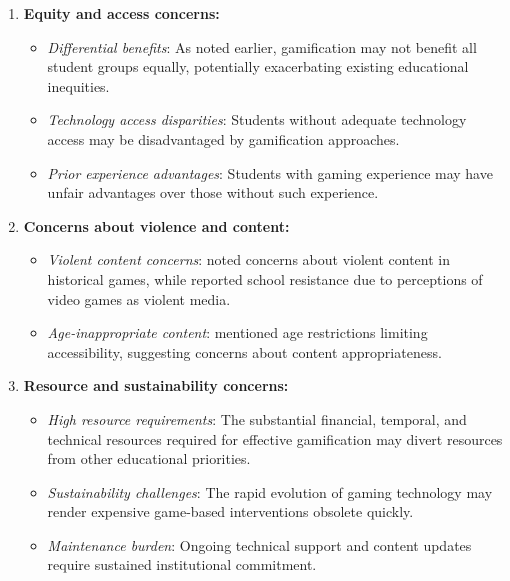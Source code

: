 \documentclass[a4paper,fleqn]{cas-sc}
\begin{document}
\begin{enumerate}[noitemsep]
	\item 
\textbf{Equity and access concerns:}

\begin{itemize}[noitemsep]
 \item \textit{Differential benefits}: As noted earlier, gamification may not benefit all student groups equally, potentially exacerbating existing educational inequities.
 
 \item \textit{Technology access disparities}: Students without adequate technology access \citep{77Ramansyah2021} may be disadvantaged by gamification approaches.
 
 \item \textit{Prior experience advantages}: Students with gaming experience may have unfair advantages over those without such experience.
\end{itemize}

	\item 
\textbf{Concerns about violence and content:}

\begin{itemize}[noitemsep]
 \item \textit{Violent content concerns}: \citet{77Ramansyah2021} noted concerns about violent content in historical games, while \citet{12Gilbert2019108} reported school resistance due to perceptions of video games as violent media.
 
 \item \textit{Age-inappropriate content}: \citet{72hutauruk2020utilization} mentioned age restrictions limiting accessibility, suggesting concerns about content appropriateness.
\end{itemize}

	\item 
\textbf{Resource and sustainability concerns:}

\begin{itemize}[noitemsep]
 \item \textit{High resource requirements}: The substantial financial, temporal, and technical resources required for effective gamification may divert resources from other educational priorities.
 
 \item \textit{Sustainability challenges}: The rapid evolution of gaming technology may render expensive game-based interventions obsolete quickly.
 
 \item \textit{Maintenance burden}: Ongoing technical support and content updates require sustained institutional commitment.
\end{itemize}
\end{enumerate}
\end{document}
